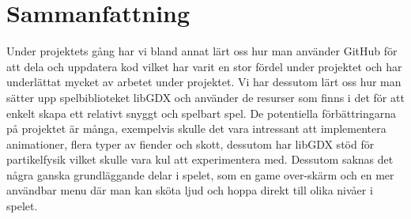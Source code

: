 \documentclass[a4paper,11pt]{article}
\begin{document}
\section{Sammanfattning}
Under projektets gång har vi bland annat lärt oss hur man använder GitHub för att dela och uppdatera kod vilket har varit en stor fördel under projektet och har underlättat mycket av arbetet under projektet. Vi har dessutom lärt oss hur man sätter upp spelbiblioteket libGDX och använder de resurser som finns i det för att enkelt skapa ett relativt snyggt och spelbart spel. De potentiella förbättringarna på projektet är många, exempelvis skulle det vara intressant att implementera animationer, flera typer av fiender och skott, dessutom har libGDX stöd för partikelfysik vilket skulle vara kul att experimentera med. Dessutom saknas det några ganska grundläggande delar i spelet, som en game over-skärm och en mer användbar menu där man kan sköta ljud och hoppa direkt till olika nivåer i spelet.
\end{document}
